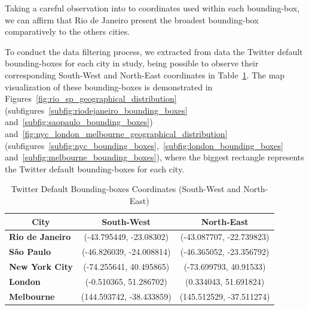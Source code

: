 Taking a careful observation into to coordinates used within each bounding-box, we can affirm that Rio de Janeiro present the broadest bounding-box comparatively to the others cities.

To conduct the data filtering process, we extracted from data the Twitter default bounding-boxes for each city in study, being possible to observe their corresponding South-West and North-East coordinates in Table~\ref{tab:bbs_filter}. The map visualization of these bounding-boxes is demonstrated in Figures~\ref{fig:rio_sp_geographical_distribution} (subfigures~\ref{subfig:riodejaneiro_bounding_boxes} and~\ref{subfig:saopaulo_bounding_boxes}) and~\ref{fig:nyc_london_melbourne_geographical_distribution} (subfigures~\ref{subfig:nyc_bounding_boxes},~\ref{subfig:london_bounding_boxes} and~\ref{subfig:melbourne_bounding_boxes}), where the biggest rectangle represents the Twitter default bounding-boxes for each city.

\begin{table}[htbp]
	\centering
	\setlength\extrarowheight{3pt}
	\caption{Twitter Default Bounding-boxes Coordinates (South-West and North-East)}
	\label{tab:bbs_filter}
	\begin{tabular}{l|c|c}
		\hline
		\multicolumn{1}{c|}{\textbf{City}} & \textbf{South-West} & \textbf{North-East} \\ \hline
		\textbf{Rio de Janeiro} & (-43.795449, -23.08302) & (-43.087707, -22.739823) \\
		\textbf{São Paulo} & (-46.826039, -24.008814) & (-46.365052, -23.356792) \\
		\textbf{New York City} & (-74.255641, 40.495865) & (-73.699793, 40.91533) \\
		\textbf{London} & (-0.510365, 51.286702) & (0.334043, 51.691824) \\
		\textbf{Melbourne} & (144.593742, -38.433859) & (145.512529, -37.511274) \\ \hline
	\end{tabular}
\end{table}

